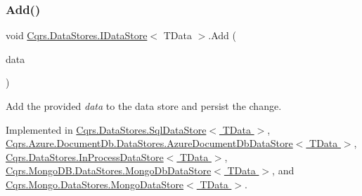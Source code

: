 \mbox{\label{interfaceCqrs_1_1DataStores_1_1IDataStore_a906f3f2f80db7a549a4170eca4653e26}} 
\subsubsection{\texorpdfstring{Add()}{Add()}\hspace{0.1cm}{\footnotesize\ttfamily [2/2]}}
{\footnotesize\ttfamily void \hyperlink{interfaceCqrs_1_1DataStores_1_1IDataStore}{Cqrs.\+Data\+Stores.\+I\+Data\+Store}$<$ T\+Data $>$.Add (\begin{DoxyParamCaption}\item[{I\+Enumerable$<$ T\+Data $>$}]{data }\end{DoxyParamCaption})}



Add the provided {\itshape data}  to the data store and persist the change. 



Implemented in \hyperlink{classCqrs_1_1DataStores_1_1SqlDataStore_a45aa105f2571510223c6073804690487}{Cqrs.\+Data\+Stores.\+Sql\+Data\+Store$<$ T\+Data $>$}, \hyperlink{classCqrs_1_1Azure_1_1DocumentDb_1_1DataStores_1_1AzureDocumentDbDataStore_a2d91050f17273687e44a121623803e7a}{Cqrs.\+Azure.\+Document\+Db.\+Data\+Stores.\+Azure\+Document\+Db\+Data\+Store$<$ T\+Data $>$}, \hyperlink{classCqrs_1_1DataStores_1_1InProcessDataStore_ad62504e478f0a907c18ec4aa9b42703a}{Cqrs.\+Data\+Stores.\+In\+Process\+Data\+Store$<$ T\+Data $>$}, \hyperlink{classCqrs_1_1MongoDB_1_1DataStores_1_1MongoDbDataStore_a709fc1e29d266a7c19a46bd181d03963}{Cqrs.\+Mongo\+D\+B.\+Data\+Stores.\+Mongo\+Db\+Data\+Store$<$ T\+Data $>$}, and \hyperlink{classCqrs_1_1Mongo_1_1DataStores_1_1MongoDataStore_a38c242b255dc17cf8d19470fdf5a99bf}{Cqrs.\+Mongo.\+Data\+Stores.\+Mongo\+Data\+Store$<$ T\+Data $>$}.

\mbox{\label{interfaceCqrs_1_1DataStores_1_1IDataStore_aa7ade96f2f3151d5353cf7bdbb2baec5}} 
